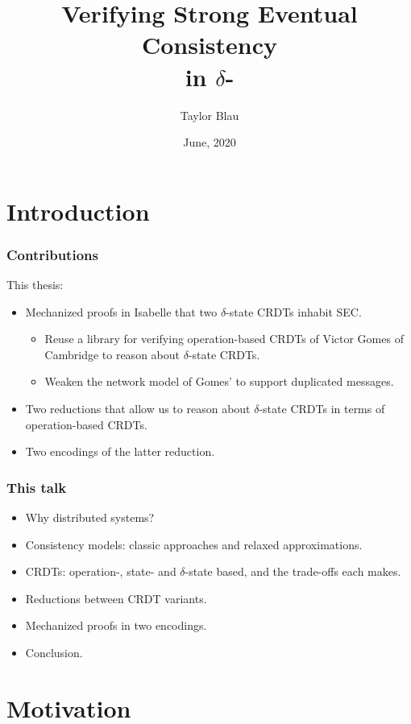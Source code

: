 \documentclass[aspectratio=169,compress,handout]{beamer}
\title{Verifying Strong Eventual Consistency\\ in $\delta$-\CRDTs}
\author{Taylor Blau}
\institute{University of Washington}
\date{June, 2020}
\newcommand*{\CRDT}{\textsf{CRDT}\xspace}
\newcommand*{\CRDTs}{\textsf{CRDTs}\xspace}
\newcommand*{\SEC}{\textsf{SEC}\xspace}
\begin{document}
  \frame{\titlepage}

  \section{Introduction}

  \begin{frame}
    \frametitle{Contributions}

    This thesis:
    \begin{itemize}[<+->]
      \item Mechanized proofs in Isabelle that two $\delta$-state \CRDTs inhabit
        \SEC.
        \begin{itemize}
          \item Reuse a library for verifying operation-based \CRDTs of Victor
            Gomes of Cambridge to reason about $\delta$-state \CRDTs.
          \item Weaken the network model of Gomes' to support duplicated
            messages.
        \end{itemize}
      \item Two reductions that allow us to reason about $\delta$-state \CRDTs
        in terms of operation-based \CRDTs.
      \item Two encodings of the latter reduction.
    \end{itemize}
  \end{frame}

  \begin{frame}
    \frametitle{This talk}

    \begin{itemize}[<+->]
      \item Why distributed systems?
      \item Consistency models: classic approaches and relaxed approximations.
      \item \CRDTs: operation-, state- and $\delta$-state based, and the
        trade-offs each makes.
      \item Reductions between \CRDT variants.
      \item Mechanized proofs in two encodings.
      \item Conclusion.
    \end{itemize}
  \end{frame}

  \section{Motivation}
\end{document}
